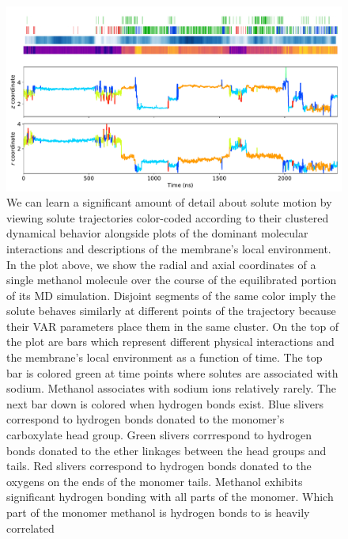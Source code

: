 \documentclass{article}
\begin{document}
  \begin{figure}
  \includegraphics[width=\textwidth]{mechanism_map.pdf}
  \caption{We can learn a significant amount of detail about solute motion by viewing 
  solute trajectories color-coded according to their clustered dynamical behavior alongside
  plots of the dominant molecular interactions and descriptions of the membrane's local 
  environment. In the plot above, we show the radial and axial coordinates of a 
  single
  methanol molecule over the course of the equilibrated portion of its MD simulation.
  Disjoint segments of the same color imply the solute behaves similarly at different 
  points of the trajectory because their VAR parameters %
  place them in
  the same 
  cluster. 
  On the top of
the plot are bars which represent different physical interactions and
  the membrane's local environment as a function of time. The top bar is colored green 
  at time points where solutes are associated with sodium. Methanol associates
  with sodium ions relatively rarely. The next bar down is colored when hydrogen bonds exist. Blue slivers
  correspond to hydrogen bonds donated to the monomer's carboxylate head group. Green slivers
  corrrespond to  hydrogen bonds donated to the ether linkages between the head groups
  and tails. Red slivers correspond to hydrogen bonds donated to the oxygens on the ends
  of the monomer tails. Methanol exhibits significant hydrogen bonding with all parts of
  the monomer. Which part of the monomer methanol is hydrogen bonds to is heavily correlated
}
\end{figure}
\end{document}
